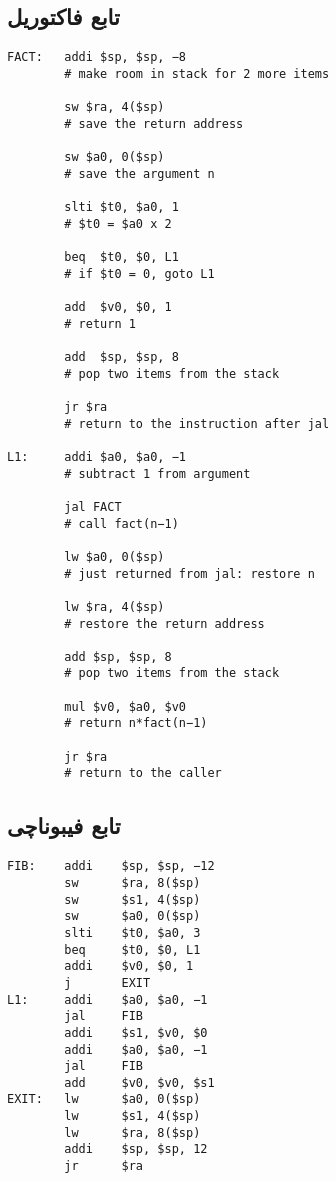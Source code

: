 \documentclass[11pt, dvipsnames, svgnames, x11names]{article}
\begin{document}
\subsection{تابع فاکتوریل}
\begin{latin}
\begin{lstlisting}[keywords={addi, sw, slti, beq, add, jr, jal, lw, mul}]
FACT:   addi $sp, $sp, −8 
        # make room in stack for 2 more items
        
        sw $ra, 4($sp)     
        # save the return address
        
        sw $a0, 0($sp)    
        # save the argument n
        
        slti $t0, $a0, 1    
        # $t0 = $a0 x 2
        
        beq  $t0, $0, L1    
        # if $t0 = 0, goto L1
        
        add  $v0, $0, 1     
        # return 1
        
        add  $sp, $sp, 8    
        # pop two items from the stack
        
        jr $ra              
        # return to the instruction after jal

L1:     addi $a0, $a0, −1   
        # subtract 1 from argument
        
        jal FACT            
        # call fact(n−1)
        
        lw $a0, 0($sp)      
        # just returned from jal: restore n
        
        lw $ra, 4($sp)      
        # restore the return address
        
        add $sp, $sp, 8     
        # pop two items from the stack
        
        mul $v0, $a0, $v0   
        # return n*fact(n−1)
        
        jr $ra              
        # return to the caller
\end{lstlisting}
\end{latin}
\subsection{تابع فیبوناچی}
\begin{latin}
\begin{lstlisting}[keywords={addi, sw, slti, beq, addi, j, jal, add, lw, jr}]
FIB:    addi    $sp, $sp, −12
        sw      $ra, 8($sp)
        sw      $s1, 4($sp)
        sw      $a0, 0($sp)
        slti    $t0, $a0, 3
        beq     $t0, $0, L1
        addi    $v0, $0, 1
        j       EXIT
L1:     addi    $a0, $a0, −1
        jal     FIB
        addi    $s1, $v0, $0
        addi    $a0, $a0, −1
        jal     FIB
        add     $v0, $v0, $s1
EXIT:   lw      $a0, 0($sp)
        lw      $s1, 4($sp)
        lw      $ra, 8($sp)
        addi    $sp, $sp, 12
        jr      $ra
\end{lstlisting}
\end{latin}
\end{document}
